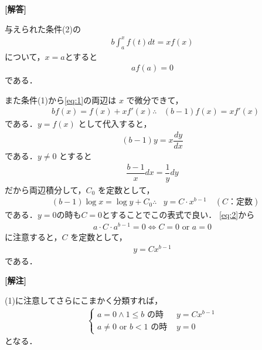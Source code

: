 \documentclass[../../main.tex]{subfiles}
\begin{document}
\begin{oframed}
  
\end{oframed}

{\bf [解答]}

与えられた条件(2)の
\begin{align}
  b\int_a^x f(t)dt=xf(x) \label{eq:1}
\end{align}
について，$x=a$とすると
\begin{align}
  a f(a) = 0 \label{eq:2}
\end{align}
である．

また条件(1)から\cref{eq:1}の両辺は $x$ で微分できて，
\begin{align}
  & b f(x) = f(x) + x f'(x)
  \therefore
  & (b-1) f(x) = x f'(x) \label{eq:3}
\end{align}
である．$y = f(x)$ として代入すると，
\begin{align}
  (b-1) y = x \dfrac{dy}{dx} \label{eq:4}
\end{align}
である．$y \neq 0$ とすると
\begin{align}
  \dfrac{b-1}{x} dx = \dfrac{1}{y} dy
\end{align}
だから両辺積分して，$C_0$ を定数として，
\begin{align}
  & (b-1) \log x = \log y + C_0
  \therefore
  & y = C \cdot x^{b-1} \quad (C\text{：定数})
\end{align}
である．$y=0$の時も$C=0$とすることでこの表式で良い．
\cref{eq:2}から
\begin{align}
  a \cdot C \cdot a^{b-1} = 0 \iff C = 0 \text{ or } a = 0
\end{align}
に注意すると，$C$ を定数として，
\begin{align}
  y = C x^{b-1}
\end{align}
である．

{\bf [解注]}

(1)に注意してさらにこまかく分類すれば，
\begin{align}
  \begin{cases}
    a=0 \wedge 1 \le b \text{ の時 } & y = C x^{b-1} \\
    a \neq 0 \text{ or } b < 1 \text{ の時 } & y = 0
  \end{cases}
\end{align}
となる．
\end{document}
